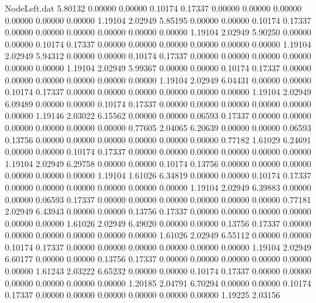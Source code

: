 \begin{filecontents}{NodeLeft.dat}
   5.80132    0.00000    0.00000     0.10174    0.17337    0.00000    0.00000    0.00000    0.00000    0.00000    0.00000    1.19104    2.02949
   5.85195    0.00000    0.00000     0.10174    0.17337    0.00000    0.00000    0.00000    0.00000    0.00000    0.00000    1.19104    2.02949
   5.90250    0.00000    0.00000     0.10174    0.17337    0.00000    0.00000    0.00000    0.00000    0.00000    0.00000    1.19104    2.02949
   5.94312    0.00000    0.00000     0.10174    0.17337    0.00000    0.00000    0.00000    0.00000    0.00000    0.00000    1.19104    2.02949
   5.99367    0.00000    0.00000     0.10174    0.17337    0.00000    0.00000    0.00000    0.00000    0.00000    0.00000    1.19104    2.02949
   6.04431    0.00000    0.00000     0.10174    0.17337    0.00000    0.00000    0.00000    0.00000    0.00000    0.00000    1.19104    2.02949
   6.09489    0.00000    0.00000     0.10174    0.17337    0.00000    0.00000    0.00000    0.00000    0.00000    0.00000    1.19146    2.03022
   6.15562    0.00000    0.00000     0.06593    0.17337    0.00000    0.00000    0.00000    0.00000    0.00000    0.00000    0.77605    2.04065
   6.20639    0.00000    0.00000     0.06593    0.13756    0.00000    0.00000    0.00000    0.00000    0.00000    0.00000    0.77182    1.61029
   6.24691    0.00000    0.00000     0.10174    0.17337    0.00000    0.00000    0.00000    0.00000    0.00000    0.00000    1.19104    2.02949
   6.29758    0.00000    0.00000     0.10174    0.13756    0.00000    0.00000    0.00000    0.00000    0.00000    0.00000    1.19104    1.61026
   6.34819    0.00000    0.00000     0.10174    0.17337    0.00000    0.00000    0.00000    0.00000    0.00000    0.00000    1.19104    2.02949
   6.39883    0.00000    0.00000     0.06593    0.17337    0.00000    0.00000    0.00000    0.00000    0.00000    0.00000    0.77181    2.02949
   6.43943    0.00000    0.00000     0.13756    0.17337    0.00000    0.00000    0.00000    0.00000    0.00000    0.00000    1.61026    2.02949
   6.49020    0.00000    0.00000     0.13756    0.17337    0.00000    0.00000    0.00000    0.00000    0.00000    0.00000    1.61026    2.02949
   6.55112    0.00000    0.00000     0.10174    0.17337    0.00000    0.00000    0.00000    0.00000    0.00000    0.00000    1.19104    2.02949
   6.60177    0.00000    0.00000     0.13756    0.17337    0.00000    0.00000    0.00000    0.00000    0.00000    0.00000    1.61243    2.03222
   6.65232    0.00000    0.00000     0.10174    0.17337    0.00000    0.00000    0.00000    0.00000    0.00000    0.00000    1.20185    2.04791
   6.70294    0.00000    0.00000     0.10174    0.17337    0.00000    0.00000    0.00000    0.00000    0.00000    0.00000    1.19225    2.03156

\end{filecontents}
